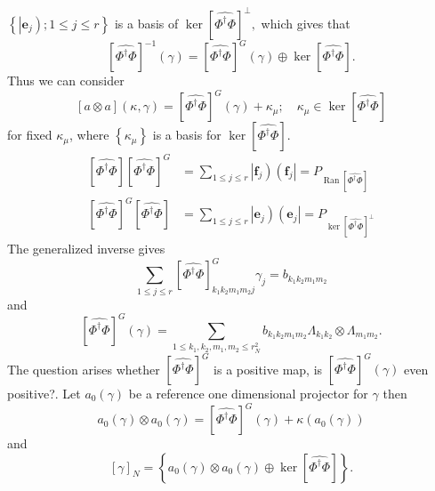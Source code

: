 \documentclass[aps,preprint]{revtex4}%
\begin{document}
$\left\{  \left\vert \mathbf{e}_{j}\right)  ;1\leq j\leq r\right\}  $ is a
basis of $\ker\left[  \widehat{\Phi^{\dagger}\Phi}\right]  ^{\bot},$ which
gives that
\begin{equation}
\left[  \widehat{\Phi^{\dagger}\Phi}\right]  ^{-1}\left(  \gamma\right)
=\left[  \widehat{\Phi^{\dagger}\Phi}\right]  ^{G}\left(  \gamma\right)
\oplus\ker\left[  \widehat{\Phi^{\dagger}\Phi}\right]  .
\end{equation}
Thus we can consider
\begin{equation}
\left[  a\otimes a\right]  \left(  \kappa,\gamma\right)  =\left[
\widehat{\Phi^{\dagger}\Phi}\right]  ^{G}\left(  \gamma\right)  +\kappa_{\mu
};\quad\kappa_{\mu}\in\ker\left[  \widehat{\Phi^{\dagger}\Phi}\right]
\end{equation}
for fixed $\kappa_{\mu}$, where $\left\{  \kappa_{\mu}\right\}  $ is a basis
for $\ker\left[  \widehat{\Phi^{\dagger}\Phi}\right]  .$%
\begin{align}
\left[  \widehat{\Phi^{\dagger}\Phi}\right]  \left[  \widehat{\Phi^{\dagger
}\Phi}\right]  ^{G}  &  =\sum_{1\leq j\leq r}\left\vert \mathbf{f}_{j}\right)
\left(  \mathbf{f}_{j}\right\vert =P_{\operatorname{Ran}\left[  \widehat
{\Phi^{\dagger}\Phi}\right]  }\\
\left[  \widehat{\Phi^{\dagger}\Phi}\right]  ^{G}\left[  \widehat
{\Phi^{\dagger}\Phi}\right]   &  =\sum_{1\leq j\leq r}\left\vert
\mathbf{e}_{j}\right)  \left(  \mathbf{e}_{j}\right\vert =P_{\ker\left[
\widehat{\Phi^{\dagger}\Phi}\right]  ^{\bot}}%
\end{align}
The generalized inverse gives
\begin{equation}
\sum_{1\leq j\leq r}\left[  \widehat{\Phi^{\dagger}\Phi}\right]  _{k_{1}%
k_{2}m_{1}m_{2}j}^{G}\gamma_{j}=b_{k_{1}k_{2}m_{1}m_{2}}%
\end{equation}
and
\begin{equation}
\left[  \widehat{\Phi^{\dagger}\Phi}\right]  ^{G}\left(  \gamma\right)
=\sum_{1\leq k_{1},k_{2},m_{1},m_{2}\leq r_{N}^{2}}b_{k_{1}k_{2}m_{1}m_{2}%
}\Lambda_{k_{1}k_{2}}\otimes\Lambda_{m_{1}m_{2}}.
\end{equation}
The question arises whether $\left[  \widehat{\Phi^{\dagger}\Phi}\right]
^{G}$ is a positive map, is $\left[  \widehat{\Phi^{\dagger}\Phi}\right]
^{G}\left(  \gamma\right)  $ even positive?. Let $a_{0}\left(  \gamma\right)
$ be a reference one dimensional projector for $\gamma$ then
\begin{equation}
a_{0}\left(  \gamma\right)  \otimes a_{0}\left(  \gamma\right)  =\left[
\widehat{\Phi^{\dagger}\Phi}\right]  ^{G}\left(  \gamma\right)  +\kappa\left(
a_{0}\left(  \gamma\right)  \right)
\end{equation}
and
\begin{equation}
\left[  \gamma\right]  _{N}=\left\{  a_{0}\left(  \gamma\right)  \otimes
a_{0}\left(  \gamma\right)  \oplus\ker\left[  \widehat{\Phi^{\dagger}\Phi
}\right]  \right\}  .
\end{equation}
\end{document}
